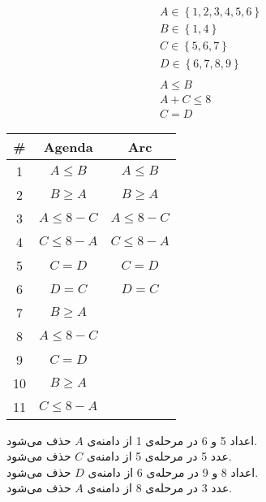 \documentclass{article}
\begin{document}
\subsection{}
\begin{fleqn}
\begin{equation}
\begin{aligned}
A \in \left\{ 1, 2, 3, 4, 5, 6 \right\} \\
B \in \left\{ 1, 4 \right\} \\
C \in \left\{ 5, 6, 7 \right\} \\
D \in \left\{ 6, 7, 8, 9 \right\} \\ \\
A \le B \\
A + C \le 8 \\
C = D
\end{aligned}
\end{equation}
\end{fleqn}
\begin{latin}
\begin{table}[H]
\begin{tabular}{|c|c|c|}
\hline
\# & \textbf{Agenda} & \textbf{Arc}  \\ \hline
1  & $A \le B$       & $A \le B$     \\ \hline
2  & $B \ge A$       & $B \ge A$     \\ \hline
3  & $A \le 8 - C$   & $A \le 8 - C$ \\ \hline
4  & $C \le 8 - A$   & $C \le 8 - A$ \\ \hline
5  & $C = D$         & $C = D$       \\ \hline
6  & $D = C$         & $D = C$       \\ \hline
7  & $B \ge A$       &               \\ \hline
8  & $A \le 8 - C$   &               \\ \hline
9  & $C = D$         &               \\ \hline
10 & $B \ge A$       &               \\ \hline
11 & $C \le 8 - A$   &               \\ \hline
\end{tabular}
\end{table}
\end{latin}
اعداد 5 و 6 در مرحله‌ی 1 از دامنه‌ی $A$ حذف می‌شود.\\
عدد 5 در مرحله‌ی 5 از دامنه‌ی $C$ حذف می‌شود.\\
اعداد 8 و 9 در مرحله‌ی 6 از دامنه‌ی $D$ حذف می‌شود.\\
عدد 3 در مرحله‌ی 8 از دامنه‌ی $A$ حذف می‌شود.
\end{document}
